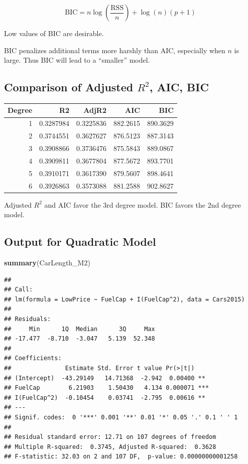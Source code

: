 \documentclass[]{book}
\newenvironment{Shaded}{\begin{snugshade}}{\end{snugshade}}
\newcommand{\KeywordTok}[1]{\textcolor[rgb]{0.13,0.29,0.53}{\textbf{#1}}}
\newcommand{\NormalTok}[1]{#1}
\begin{document}
\[
\text{BIC} = n\log\left(\frac{\text{RSS}}{n}\right) + \log(n)(p+1)
\]

Low values of BIC are desirable.

BIC penalizes additional terms more harshly than AIC, especially when
\(n\) is large. Thus BIC will lead to a ``smaller'' model.

\subsection{\texorpdfstring{Comparison of Adjusted \(R^2\), AIC,
BIC}{Comparison of Adjusted R\^{}2, AIC, BIC}}\label{comparison-of-adjusted-r2-aic-bic}

\begin{tabular}{r|r|r|r|r}
\hline
Degree & R2 & AdjR2 & AIC & BIC\\
\hline
1 & 0.3287984 & 0.3225836 & 882.2615 & 890.3629\\
\hline
2 & 0.3744551 & 0.3627627 & 876.5123 & 887.3143\\
\hline
3 & 0.3908866 & 0.3736476 & 875.5843 & 889.0867\\
\hline
4 & 0.3909811 & 0.3677804 & 877.5672 & 893.7701\\
\hline
5 & 0.3910171 & 0.3617390 & 879.5607 & 898.4641\\
\hline
6 & 0.3926863 & 0.3573088 & 881.2588 & 902.8627\\
\hline
\end{tabular}

Adjusted \(R^2\) and AIC favor the 3rd degree model. BIC favors the 2nd
degree model.

\subsection{Output for Quadratic
Model}\label{output-for-quadratic-model}

\begin{Shaded}
\begin{Highlighting}[]
\KeywordTok{summary}\NormalTok{(CarLength_M2)}
\end{Highlighting}
\end{Shaded}

\begin{verbatim}
## 
## Call:
## lm(formula = LowPrice ~ FuelCap + I(FuelCap^2), data = Cars2015)
## 
## Residuals:
##     Min      1Q  Median      3Q     Max 
## -17.477  -8.710  -3.047   5.139  52.348 
## 
## Coefficients:
##               Estimate Std. Error t value Pr(>|t|)    
## (Intercept)  -43.29149   14.71368  -2.942  0.00400 ** 
## FuelCap        6.21903    1.50430   4.134 0.000071 ***
## I(FuelCap^2)  -0.10454    0.03741  -2.795  0.00616 ** 
## ---
## Signif. codes:  0 '***' 0.001 '**' 0.01 '*' 0.05 '.' 0.1 ' ' 1
## 
## Residual standard error: 12.71 on 107 degrees of freedom
## Multiple R-squared:  0.3745, Adjusted R-squared:  0.3628 
## F-statistic: 32.03 on 2 and 107 DF,  p-value: 0.00000000001258
\end{verbatim}
\end{document}
